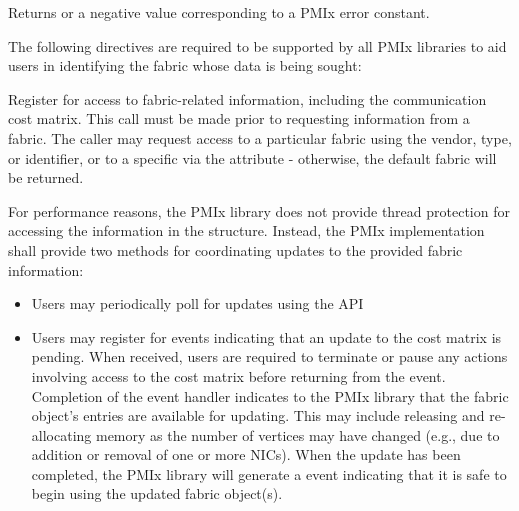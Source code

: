 \begin{arglist}
\end{arglist}

Returns  or a negative value corresponding to a \ac{PMIx} error constant.

\reqattrstart
The following directives are required to be supported by all \ac{PMIx} libraries to aid users in identifying the fabric whose data is being sought:


\reqattrend

\descr

Register for access to fabric-related information, including the communication cost matrix. This call must be made prior to requesting information from a fabric. The caller may request access to a particular fabric using the vendor, type, or identifier, or to a specific  via the  attribute - otherwise, the default fabric will be returned.

For performance reasons, the \ac{PMIx} library does not provide thread protection for accessing the information in the  structure. Instead, the \ac{PMIx} implementation shall provide two methods for coordinating updates to the provided fabric information:

\begin{itemize}

    \item Users may periodically poll for updates using the  \ac{API}

    \item Users may register for  events indicating that an update to the cost matrix is pending. When received, users are required to terminate or pause any actions involving access to the cost matrix before returning from the event. Completion of the  event handler indicates to the \ac{PMIx} library that the fabric object's entries are available for updating. This may include releasing and re-allocating memory as the number of vertices may have changed (e.g., due to addition or removal of one or more \acp{NIC}). When the update has been completed, the \ac{PMIx} library will generate a  event indicating that it is safe to begin using the updated fabric object(s).

\end{itemize}

